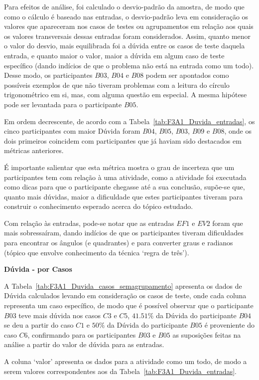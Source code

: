Para efeitos de análise, foi calculado o desvio-padrão da amostra, de modo que como o cálculo é baseado nas entradas, o desvio-padrão leva em consideração os valores que apareceram nos casos de testes ou agrupamentos em relação aos quais os valores transversais dessas entradas foram considerados. Assim, quanto menor o valor do desvio, mais equilibrada foi a dúvida entre os casos de teste daquela entrada, e quanto maior o valor, maior a dúvida em algum caso de teste específico (dando indícios de que o problema não está na entrada como um todo). Desse modo, os participantes $B03$, $B04$ e $B08$ podem ser apontados como possíveis exemplos de que não tiveram problemas com a leitura do círculo trigonométrico em si, mas, com alguma questão em especial. A mesma hipótese pode ser levantada para o participante $B05$.

Em ordem decrescente, de acordo com a Tabela~\ref{tab:F3A1_Duvida_entradas}, os cinco participantes com maior Dúvida foram $B04$, $B05$, $B03$, $B09$ e $B08$, onde os dois primeiros coincidem com participantes que já haviam sido destacados em métricas anteriores. 

É importante salientar que esta métrica mostra o grau de incerteza que um participantes tem com relação à uma atividade, como a atividade foi executada como dicas para que o participante chegasse até a sua conclusão, supõe-se que, quanto mais dúvidas, maior a dificuldade que estes participantes tiveram para construir o conhecimento esperado acerca do tópico estudado.

Com relação às entradas, pode-se notar que as entradas $EF1$ e $EV2$ foram que mais sobressaíram, dando indícios de que os participantes tiveram dificuldades para encontrar os ângulos (e quadrantes) e para converter graus e radianos (tópico que envolve conhecimento da técnica `regra de três').
 
\textbf{Dúvida - por Casos}

A Tabela~\ref{tab:F3A1_Duvida_casos_semagrupamento} apresenta os dados de Dúvida calculados levando em consideração os casos de teste, onde cada coluna representa um caso específico, de modo que é possível observar que o participante $B03$ teve mais dúvida nos casos $C3$ e $C5$, $41.51\%$ da Dúvida do participante $B04$ se deu a partir do caso $C1$ e $50\%$ da Dúvida do participante $B05$ é proveniente do caso $C6$, confirmando para os participantes $B03$ e $B05$ as suposições feitas na análise a partir do valor de dúvida para as entradas.

A coluna `valor' apresenta os dados para a atividade como um todo, de modo a serem valores correspondentes aos da Tabela~\ref{tab:F3A1_Duvida_entradas}.

